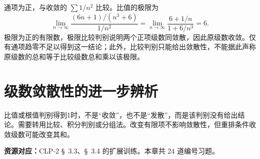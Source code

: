 \documentclass[12pt,fontset=fandol]{ctexart}
\begin{document}
\begin{solve}\label{ans:c24q24}
通项为正，与收敛的 $\sum1/n^2$ 比较。比值的极限为
\[
\lim_{n\to\infty}\frac{(6n+1)/(n^3+6)}{1/n^2}=\lim_{n\to\infty}\frac{6+1/n}{1+6/n^3}=6.
\]
极限为正的有限数，极限比较判别说明两个正项级数同敛散，因此原级数收敛。仅有通项趋零不足以得到这一结论；此外，比较判别只能给出敛散性，不能据此声称原级数的总和等于比较级数总和乘以该极限。
\end{solve}

\clearpage
\section{级数敛散性的进一步辨析}\label{sec:ch25}
比值或根值判别得到1时，不是“收敛”，也不是“发散”，而是该判别没有给出结论。需要转用比较、积分判别或分组法。改变有限项不影响敛散性，但重排条件收敛级数可能改变其和。

\textbf{资源对应：}CLP-2 \S~3.3、\S~3.4 的扩展训练。本章共 24 道编号习题。
\end{document}
